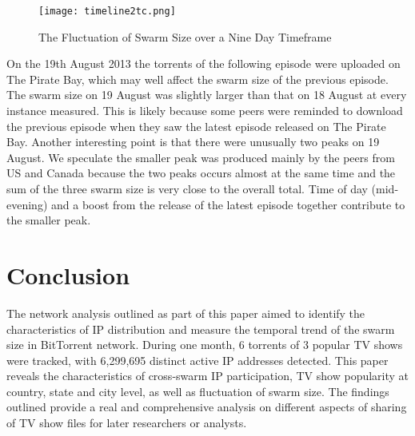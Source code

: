 \documentclass[conference]{IEEEtran}
\begin{document}
\begin{figure}[!h]
\centering
\texttt{[image: timeline2tc.png]}
\caption{The Fluctuation of Swarm Size over a Nine Day Timeframe}
\label{fluctuationsmaller}
\end{figure}

On the 19th August 2013 the torrents of the following episode were uploaded on The Pirate Bay, which may well affect the swarm size of the previous episode. The swarm size on 19 August was slightly larger than that on 18 August at every instance measured. This is likely because some peers were reminded to download the previous episode when they saw the latest episode released on The Pirate Bay. 
Another interesting point is that there were unusually two peaks on 19 August. We speculate the smaller peak was produced mainly by the peers from US and Canada because the two peaks occurs almost at the same time and the sum of the three swarm size is very close to the overall total. Time of day (mid-evening) and a boost from the release of the latest episode together contribute to the smaller peak.


\section{Conclusion}
The network analysis outlined as part of this paper aimed to identify the characteristics of IP distribution and measure the temporal trend of the swarm size in BitTorrent network. During one month, 6 torrents of 3 popular TV shows were tracked, with 6,299,695 distinct active IP addresses detected. This paper reveals the characteristics of cross-swarm IP participation, TV show popularity at country, state and city level, as well as fluctuation of swarm size. The findings outlined provide a real and comprehensive analysis on different aspects of sharing of TV show files for later researchers or analysts. 
\end{document}
